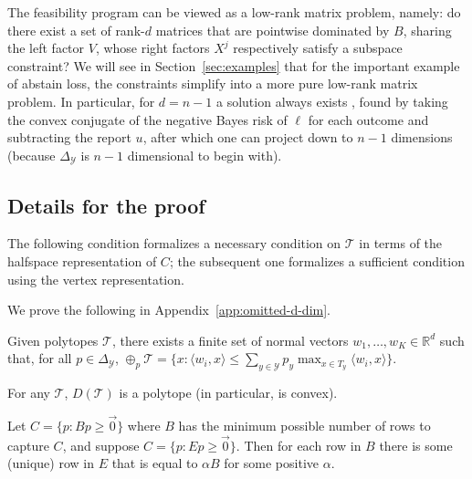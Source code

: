 \documentclass[anon]{colt2020} %
\newcommand{\reals}{\mathbb{R}}
\newcommand{\simplex}{\Delta_\Y}
\newcommand{\T}{\mathcal{T}}
\newcommand{\Y}{\mathcal{Y}}
\newcommand{\inprod}[2]{\langle #1, #2 \rangle}%
\begin{document}
The feasibility program can be viewed as a low-rank matrix problem, namely: do there exist a set of rank-$d$ matrices that are pointwise dominated by $B$, sharing the left factor $V$, whose right factors $X^j$ respectively satisfy a subspace constraint?
We will see in Section~\ref{sec:examples} that for the important example of abstain loss, the constraints simplify into a more pure low-rank matrix problem.
In particular, for $d=n-1$ a solution always exists \cite[Theorem 2]{finocchiaro2019embedding}, found by taking the convex conjugate of the negative Bayes risk of $\ell$ for each outcome and subtracting the report $u$, after which one can project down to $n-1$ dimensions (because $\simplex$ is $n-1$ dimensional to begin with).


\subsection{Details for the proof}

The following condition formalizes a necessary condition on $\T$ in terms of the halfspace representation of $C$; the subsequent one formalizes a sufficient condition using the vertex representation.

We prove the following in Appendix~\ref{app:omitted-d-dim}.
\begin{lemma}  \label{lemma:minkowski-support}
	Given polytopes $\T$, there exists a finite set of normal vectors $w_1,\ldots,w_K \in \reals^d$ such that, for all $p \in \simplex$, $\oplus_p \T = \{x : \inprod{w_i}{x} \leq \sum_{y \in \Y} p_y \max_{x \in T_y} \inprod{w_i}{x} \}$.
\end{lemma}

\begin{lemma} \label{lemma:D-polytope}
  For any $\T$, $D(\T)$ is a polytope (in particular, is convex).
\end{lemma}

\begin{lemma} \label{lemma:E-to-B}
  Let $C = \{p : Bp \geq \vec 0 \}$ where $B$ has the minimum possible number of rows to capture $C$, and suppose $C = \{p : Ep \geq \vec 0 \}$.
  Then for each row in $B$ there is some (unique) row in $E$ that is equal to $\alpha B$ for some positive $\alpha$.
\end{lemma}
\end{document}
